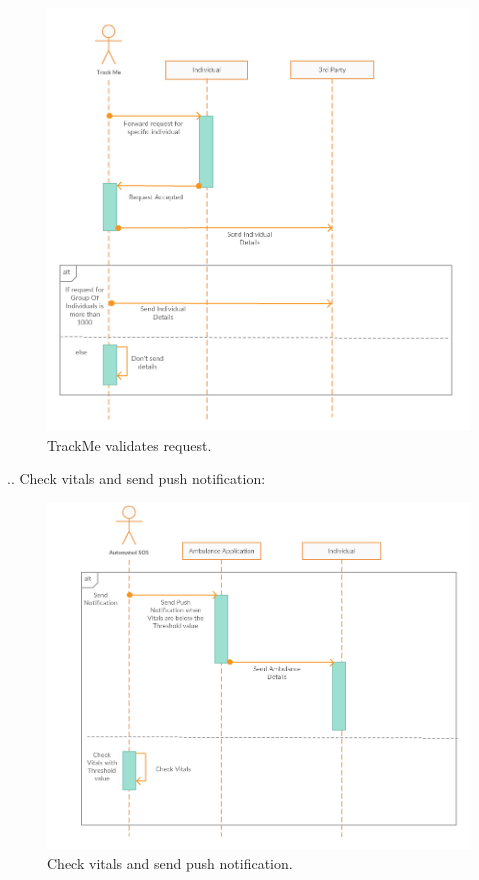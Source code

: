 \begin{figure}[H]
	\begin{center}
		\includegraphics[width=\textwidth]{./Sequence/3__TrackMe.png}
      	\caption{TrackMe validates request.}
        \label{TrackMe_seq3}
	\end{center}
\end{figure}
.\newline\newline\newline\newline\newline\newline\newline{}. Check vitals and send push notification:
\begin{figure}[H]
	\begin{center}
		\includegraphics[width=\textwidth]{./Sequence/4_Automated_SOS.png}
      	\caption{Check vitals and send push notification.}
        \label{TrackMe_seq4}
	\end{center}
\end{figure}
